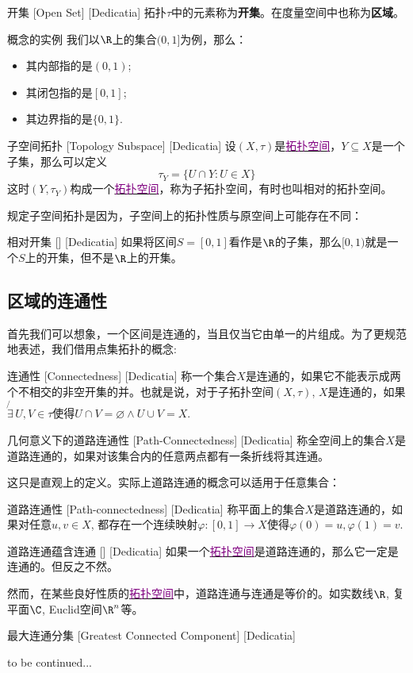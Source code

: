 \documentclass[UTF8]{ctexart}
\newcommand{\hyperrefc}[2]{\hyperref[#1]{\textcolor{purple}{#2}}}
\newcommand{\continued}{{\Large to be continued...}}
\begin{document}
\begin{ppt}
    [UUID]
    {开集}
    [Open Set]
    [Dedicatia]
    拓扑$\tau$中的元素称为\textbf{开集}。在度量空间中也称为\textbf{区域}。
\end{ppt}
\begin{xmp}
    {概念的实例}
    我们以$\R$上的集合$(0,1]$为例，那么：
    \begin{itemize}
        \item 其内部指的是$(0,1)$;
        \item 其闭包指的是$[0,1]$;
        \item 其边界指的是$\{0,1\}$.
    \end{itemize}
\end{xmp}
\begin{dfn}
    [UUID]
    {子空间拓扑}
    [Topology Subspace]
    [Dedicatia]
    设$(X,\tau)$是\hyperrefc{dfn:TopologicalSpace}{拓扑空间}，$Y\subseteq X$是一个子集，那么可以定义
    \[\tau_Y=\{U\cap Y:U\in X\}\]
    这时$(Y,\tau_Y )$构成一个\hyperrefc{dfn:TopologicalSpace}{拓扑空间}，称为子拓扑空间，有时也叫相对的拓扑空间。
\end{dfn}
规定子空间拓扑是因为，子空间上的拓扑性质与原空间上可能存在不同：
\begin{xmp}
    [UUID]
    {相对开集}
    []
    [Dedicatia]
    如果将区间$S=[0,1]$看作是$\R$的子集，那么$[0,1)$就是一个$S$上的开集，但不是$\R$上的开集。
\end{xmp}
\subsection{区域的连通性}
首先我们可以想象，一个区间是连通的，当且仅当它由单一的片组成。为了更规范地表述，我们借用点集拓扑的概念:
\begin{dfn}
    [UUID]
    {连通性}
    [Connectedness]
    [Dedicatia]
    称一个集合$X$是连通的，如果它不能表示成两个不相交的非空开集的并。也就是说，对于子拓扑空间$(X,\tau)$, $X$是连通的，如果$\not{\exists}\,U,V\in\tau$使得$U\cap V=\varnothing\land U\cup V=X$.
\end{dfn}
\begin{dfn}
    [UUID]
    {几何意义下的道路连通性}
    [Path-Connectedness]
    [Dedicatia]
    称全空间上的集合$X$是道路连通的，如果对该集合内的任意两点都有一条折线将其连通。
\end{dfn}
这只是直观上的定义。实际上道路连通的概念可以适用于任意集合：
\begin{dfn}
    [UUID]
    {道路连通性}
    [Path-connectedness]
    [Dedicatia]
    称平面上的集合$X$是道路连通的，如果对任意$u,v\in X$, 都存在一个连续映射$\varphi:[0,1]\to X$使得$\varphi(0)=u, \varphi(1)=v$.
\end{dfn}
\begin{thm}
    [UUID]
    {道路连通蕴含连通}
    []
    [Dedicatia]
    如果一个\hyperrefc{dfn:TopologicalSpace}{拓扑空间}是道路连通的，那么它一定是连通的。但反之不然。
\end{thm}
然而，在某些良好性质的\hyperrefc{dfn:TopologicalSpace}{拓扑空间}中，道路连通与连通是等价的。如实数线$\R$, 复平面$\C$, Euclid空间$\R^n$等。
\begin{dfn}
    [UUID]
    {最大连通分集}
    [Greatest Connected Component]
    [Dedicatia]
\end{dfn}
\continued
\end{document}
